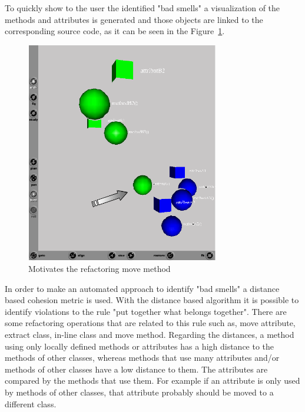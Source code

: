 
To quickly show to the user the identified "bad smells" a visualization of the methods and attributes is generated and those objects are linked to the corresponding source code, as it can be seen in the Figure~\ref{fig:MetricsBasedRefactoring}. 

\begin{figure}[h!]
  \centering
  \includegraphics[width=0.75\textwidth]{img/metricsbasedrefactoring.png}
  \caption{Motivates the refactoring move method}
  \label{fig:MetricsBasedRefactoring}
\end{figure}

In order to make an automated approach to identify "bad smells" a distance based cohesion metric is used.
With the distance based algorithm it is possible to identify violations to the rule "put together what belongs together". 
There are some refactoring operations that are related to this rule such as, move attribute, extract class, in-line class and move method. 
Regarding the distances, a method using only locally defined methods or attributes has a high distance to the methods of other classes, whereas methods that use many attributes and/or methods of other classes have a low distance to them. 
The attributes are compared by the methods that use them. 
For example if an attribute is only used by methods of other classes, that attribute probably should be moved to a different class.

